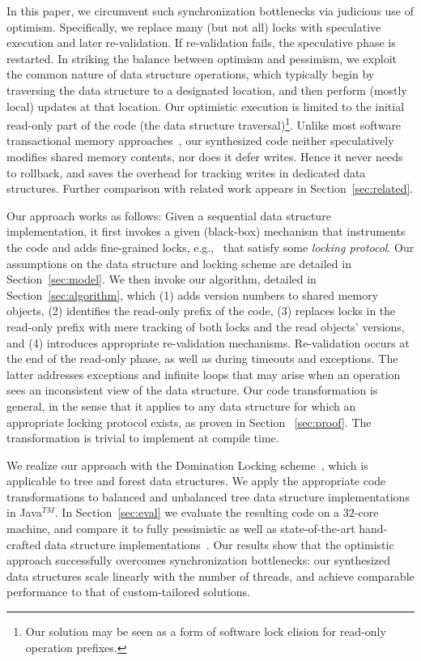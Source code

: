 In this paper, we circumvent such synchronization bottlenecks via judicious use of optimism. 
Specifically, we replace many (but not all) locks with speculative execution and later re-validation. 
If re-validation fails, the speculative phase is restarted. 
In striking the balance between optimism and pessimism, we exploit the common nature of data structure operations, 
which typically begin by traversing the data structure to a designated location, and then perform (mostly local) updates at that location. 
Our optimistic execution is limited to the initial read-only part of the code (the data structure traversal)\footnote{Our solution may be seen as a form of software lock elision for read-only operation prefixes.}. 
Unlike most software transactional memory approaches~\cite{stm,tls},  
our synthesized code neither speculatively modifies shared memory contents, nor does it defer writes. 
Hence it never needs to rollback, and saves the overhead for tracking writes in dedicated data structures. 
Further comparison with related work appears in Section~\ref{sec:related}.

Our approach works as follows: Given a sequential data structure implementation, 
it first invokes a given (black-box) mechanism that instruments the code and adds  
fine-grained locks, e.g.,~\cite{Gueta2011,SilberschatzK1980,dag} that satisfy some
\emph{locking protocol}. Our assumptions on the data structure and locking scheme
are detailed in Section~\ref{sec:model}. 
We then invoke our algorithm, detailed in Section~\ref{sec:algorithm}, which 
(1) adds version numbers to shared memory objects, 
(2) identifies the read-only prefix of the code, 
(3) replaces locks in the read-only prefix with mere tracking of both locks and the read objects' versions, and 
(4) introduces appropriate re-validation mechanisms.  
Re-validation occurs at the end of the read-only phase, as well as during timeouts and exceptions. 
The latter addresses exceptions and infinite loops that may arise when an operation sees an inconsistent view of the data structure. 
Our code transformation is general, in the sense that it applies to any data structure for which an appropriate locking protocol exists, 
as proven in Section ~\ref{sec:proof}. The transformation is trivial to implement at compile time.

We realize our approach with the Domination Locking scheme~\cite{Gueta2011}, 
which is applicable to tree and forest data structures. 
We apply the appropriate code transformations to balanced and unbalanced tree data structure implementations in Java$^{TM}$. 
In Section~\ref{sec:eval} we evaluate the resulting code on a $32$-core machine, 
and compare it to fully pessimistic as well as state-of-the-art hand-crafted
data structure implementations~\cite{DrachslerVY2014,BronsonCCO2010}.
Our results show that the optimistic approach successfully overcomes synchronization bottlenecks:  
our synthesized data structures scale linearly  with the number of threads, 
and achieve comparable performance to that of custom-tailored solutions.

